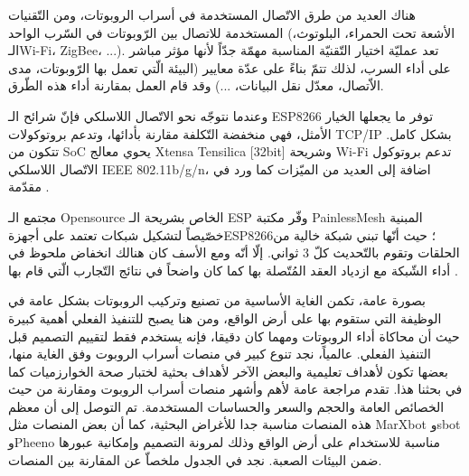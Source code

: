       هناك العديد من طرق الاتّصال المستخدمة في أسراب الروبوتات، ومن التّقنيات المستخدمة للاتصال بين الرّوبوتات في السّرب الواحد (الأشعة تحت الحمراء، البلوتوث، الـWi-Fi، ZigBee، ...). تعد عمليّة اختيار التّقنيّة المناسبة مهمّة جدّاً لأنها مؤثر مباشر على أداء السرب، لذلك تتمّ بناءً على عدّة معايير (البيئة الّتي تعمل بها الرّوبوتات، مدى الاّتصال، معدّل نقل البيانات، ...) وقد قام العمل \cite{b16} بمقارنة أداء هذه الطّرق.
      
وعندما نتوجّه نحو الاتّصال اللاسلكي فإنّ شرائح الـ ESP8266 توفر ما يجعلها الخيار الأمثل، فهي منخفضة التّكلفة مقارنة بأدائها، وتدعم بروتوكولات TCP/IP بشكل كامل.  تتكون من SoC يحوي معالج Xtensa Tensilica [32bit]  وشريحة Wi-Fi تدعم بروتوكول  الاتّصال اللاسلكي IEEE 802.11b/g/n،  اضافة إلى العديد من الميّزات كما ورد في مقدّمة \cite{b17}.

مجتمع الـ Opensource الخاص بشريحة الـ ESP وفّر مكتبة PainlessMesh المبنية خصّيصاً لتشكيل شبكات تعتمد على أجهزةESP8266؛ حيث أنّها تبني شبكة خالية من الحلقات وتقوم بالتّحديث كلّ 3 ثواني. إلّا أنّه ومع الأسف كان هنالك انخفاض ملحوظ في أداء الشّبكة مع ازدياد العقد المُتّصلة بها كما كان واضحاً في نتائج التّجارب الّتي قام بها \cite{b17}.


بصورة عامة، تكمن الغاية الأساسية من تصنيع وتركيب الروبوتات بشكل عامة في الوظيفة التي ستقوم بها على أرض الواقع، ومن هنا يصبح للتنفيذ الفعلي أهمية كبيرة حيث أن محاكاة أداء الروبوتات ومهما كان دقيقا، فإنه يستخدم فقط لتقييم التصميم قبل التنفيذ الفعلي.
عالمياً، نجد تنوع كبير في منصات أسراب الروبوت وفق الغاية منها، بعضها تكون لأهداف تعليمية والبعض الآخر لأهداف بحثية لختبار صحة الخوارزميات كما في بحثنا هذا. تقدم \cite{c4} مراجعة عامة لأهم وأشهر منصات أسراب الروبوت ومقارنة من حيث الخصائص العامة والحجم والسعر والحساسات المستخدمة. تم التوصل إلى أن معظم هذه المنصات مناسبة جدا للأغراض البحثية، كما أن بعض المنصات مثل MarXbot وsbot وPheeno مناسبة للاستخدام على أرض الواقع وذلك لمرونة التصميم وإمكانية عبورها ضمن البيئات الصعبة. نجد في الجدول ملخصاّ عن المقارنة بين المنصات.

